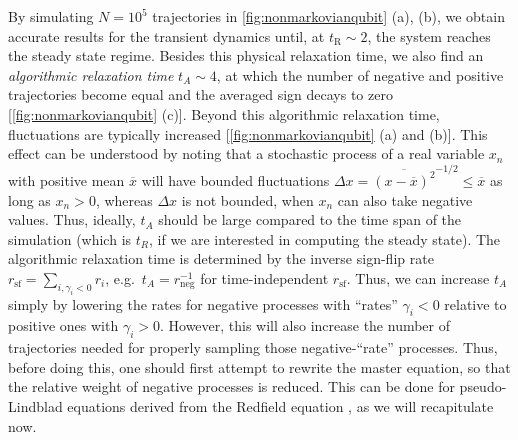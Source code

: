 \documentclass[twocolumn,prl,superscriptaddress]{revtex4-2}
\begin{document}
By simulating $N=10^5$ trajectories in \cref{fig:nonmarkovianqubit} (a), (b), we obtain accurate results for the transient dynamics until, at $t_\mathrm{R}\sim 2$, the system reaches the steady state regime. Besides this physical relaxation time, we also find an \emph{algorithmic relaxation time} $t_A \sim 4$, at which the number of negative and positive trajectories become equal and the averaged sign decays to zero [\cref{fig:nonmarkovianqubit} (c)]. Beyond this algorithmic relaxation time, fluctuations are typically increased [\cref{fig:nonmarkovianqubit} (a) and (b)]. This effect can be understood by noting that a stochastic process of a real variable $x_n$ with positive mean $\overline{x}$ will have  bounded fluctuations $\Delta x = \overline{(x-\overline{x})^2}^{-1/2}\leq \overline{x}$ as long as $x_n>0$, whereas $\Delta x$ is not bounded, when $x_n$ can also take negative values. Thus, ideally, $t_A$ should be large compared to the time span of the simulation (which is $t_R$, if we are interested in computing the steady state). The algorithmic relaxation time is determined by the inverse sign-flip rate $r_\text{sf}=\sum_{i,\gamma_i<0} r_i$, e.g.~$t_A =r_\text{neg}^{-1}$ for time-independent $r_\text{sf}$. Thus, we can increase $t_A$ simply by lowering the rates for negative processes with “rates” $\gamma_i<0$ relative to positive ones with $\gamma_i>0$. However, this will also increase the number of trajectories needed for properly sampling those negative-“rate” processes. Thus, before doing this, one should first attempt to rewrite the master equation, so that the relative weight of negative processes is reduced. This can be done for pseudo-Lindblad equations derived from the Redfield equation \cite{TBecker2021}, as we will recapitulate now.
\end{document}
